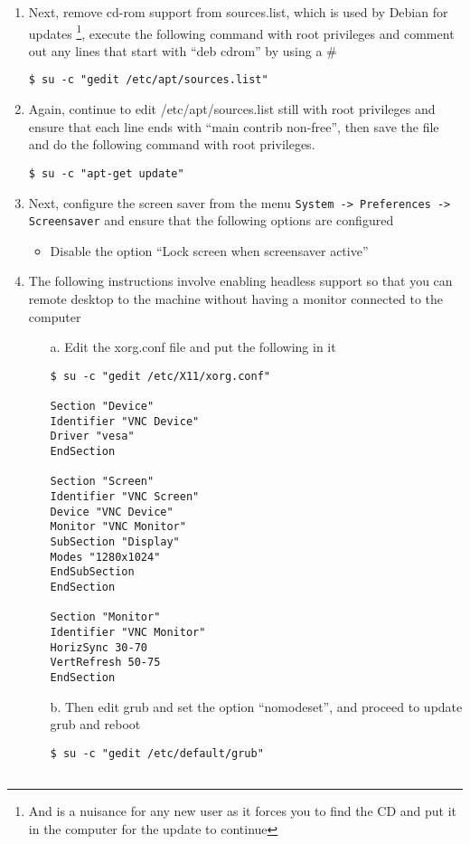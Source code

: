 \begin{enumerate}
\item Next, remove cd-rom support from sources.list, which is used by Debian for updates \footnote{And is a nuisance for any new user
as it forces you to find the CD and put it in the computer for the update to continue}, execute the following command with root privileges
and comment out any lines that start with ``deb cdrom'' by using a \#
\lstset{caption=Removing CD-ROM Requirement for Updates}
\begin{lstlisting}
$ su -c "gedit /etc/apt/sources.list"
\end{lstlisting}

\item	Again, continue to edit /etc/apt/sources.list still with root privileges and ensure that each line ends with ``main 
		contrib non-free'', then save the file and do the following command with root privileges.
\lstset{caption=Updating the System}
\begin{lstlisting}
$ su -c "apt-get update"
\end{lstlisting}

\item Next, configure the screen saver from the menu \verb|System -> Preferences -> Screensaver| and ensure that the following options are 
configured
\begin{itemize}
\item	Disable the option ``Lock screen when screensaver active''
\end{itemize}

\item 	The following instructions involve enabling headless support so that you can remote desktop to the machine without having a 
		monitor connected to the computer
\begin{itemize}
\item[a.] Edit the xorg.conf file and put the following in it
\lstset{caption=Configuring Xorg for Headless Support}
\begin{lstlisting}
$ su -c "gedit /etc/X11/xorg.conf"

Section "Device"
Identifier "VNC Device"
Driver "vesa"
EndSection

Section "Screen"
Identifier "VNC Screen"
Device "VNC Device"
Monitor "VNC Monitor"
SubSection "Display"
Modes "1280x1024"
EndSubSection
EndSection

Section "Monitor"
Identifier "VNC Monitor"
HorizSync 30-70
VertRefresh 50-75
EndSection
\end{lstlisting}
	
\item[b.] Then edit grub and set the option ``nomodeset'', and proceed to update grub and reboot
\lstset{caption=Configuring Grub for Headless Support}
\begin{lstlisting}
$ su -c "gedit /etc/default/grub"


\end{lstlisting}
\end{itemize}
\end{enumerate}
